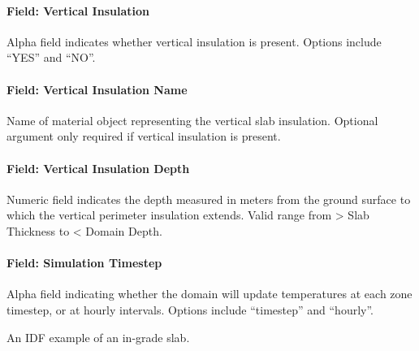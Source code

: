 \paragraph{Field: Vertical Insulation}\label{field-vertical-insulation}

Alpha field indicates whether vertical insulation is present. Options include ``YES'' and ``NO''.

\paragraph{Field: Vertical Insulation Name}\label{field-vertical-insulation-name}

Name of material object representing the vertical slab insulation. Optional argument only required if vertical insulation is present.

\paragraph{Field: Vertical Insulation Depth}\label{field-vertical-insulation-depth}

Numeric field indicates the depth measured in meters from the ground surface to which the vertical perimeter insulation extends. Valid range from \textgreater{} Slab Thickness to \textless{} Domain Depth.

\paragraph{Field: Simulation Timestep}\label{field-simulation-timestep}

Alpha field indicating whether the domain will update temperatures at each zone timestep, or at hourly intervals. Options include ``timestep'' and ``hourly''.

An IDF example of an in-grade slab.

